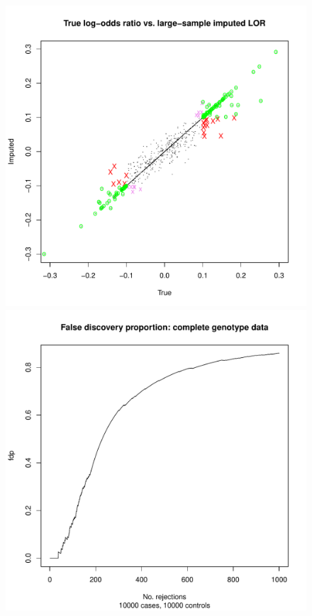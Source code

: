 \documentclass[12pt]{article}
\begin{document}
\begin{figure}[h]
\centering
\includegraphics[scale=0.25]{impute_g7.pdf}
\includegraphics[scale=0.25]{impute_g8.pdf}

\end{figure}
\end{document}
